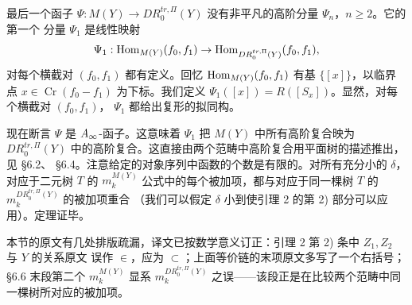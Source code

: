 最后一个函子 $\Psi:M(Y)\to DR_0^{tr,\Pi}(Y)$ 没有非平凡的高阶分量 $\Psi_n$，$n\ge2$。它的第一个
分量 $\Psi_1$ 是线性映射
\[
  \Psi_1:\operatorname{Hom}_{M(Y)}(f_0,f_1)\to\operatorname{Hom}_{DR_0^{tr,\Pi}(Y)}(f_0,f_1),
\]
对每个横截对 $(f_0,f_1)$ 都有定义。回忆 $\operatorname{Hom}_{M(Y)}(f_0,f_1)$ 有基 $\{[x]\}$，以临界点
$x\in\operatorname{Cr}(f_0-f_1)$ 为下标。我们定义 $\Psi_1([x])=R([S_x])$。显然，对每个横截对 $(f_0,f_1)$，
$\Psi_1$ 都给出复形的拟同构。

现在断言 $\Psi$ 是 $A_{\infty}$-函子。这意味着 $\Psi_1$ 把 $M(Y)$ 中所有高阶复合映为
$DR_0^{tr,\Pi}(Y)$ 中的高阶复合。这直接由两个范畴中高阶复合用平面树的描述推出，见 \S6.2、
\S6.4。注意给定的对象序列中函数的个数是有限的。对所有充分小的 $\delta$，对应于二元树 $T$ 的
$m_k^{M(Y)}$ 公式中的每个被加项，都与对应于同一棵树 $T$ 的 $m_k^{DR_0^{tr,\Pi}(Y)}$ 的被加项重合
（我们可以假定 $\delta$ 小到使引理 2 的第 2) 部分可以应用）。定理证毕。

\begin{yizhu}[原文的排版疏漏]
本节的原文有几处排版疏漏，译文已按数学意义订正：引理 2 第 2) 条中 $Z_1,Z_2$ 与 $Y$ 的关系原文
误作 $\in$，应为 $\subset$；上面等价链的末项原文多写了一个右括号；\S6.6 末段第二个 $m_k^{M(Y)}$
显系 $m_k^{DR_0^{tr,\Pi}(Y)}$ 之误——该段正是在比较两个范畴中同一棵树所对应的被加项。
\end{yizhu}

